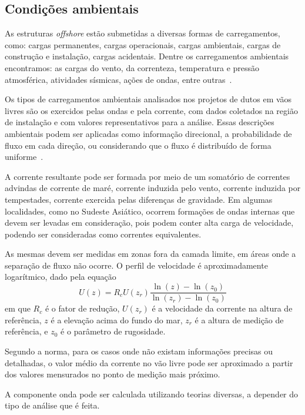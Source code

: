 \subsection{Condições ambientais}
\label{sec:condicoes-ambientais}

As estruturas \textit{offshore} estão submetidas a diversas formas de carregamentos, como: cargas permanentes, cargas operacionais, cargas ambientais, cargas de construção e instalação, cargas acidentais. Dentre os carregamentos ambientais encontramos: as cargas do vento, da correnteza, temperatura e pressão atmosférica, atividades sísmicas, ações de ondas, entre outras~\cite{Valenca2017}.

Os tipos de carregamentos ambientais analisados nos projetos de dutos em vãos livres são os exercidos pelas ondas e pela corrente, com dados coletados na região de instalação e com valores representativos para a análise. Essas descrições ambientais podem ser aplicadas como informação direcional, a probabilidade de fluxo em cada direção, ou considerando que o fluxo é distribuído de forma uniforme~\cite{DNV2017}.

A corrente resultante pode ser formada por meio de um somatório de correntes advindas de corrente de maré, corrente induzida pelo vento, corrente induzida por tempestades, corrente exercida pelas diferenças de gravidade. Em algumas localidades, como no Sudeste Asiático, ocorrem formações de ondas internas que devem ser levadas em consideração, pois podem conter alta carga de velocidade, podendo ser consideradas como correntes equivalentes.

As mesmas devem ser medidas em zonas fora da camada limite, em áreas onde a separação de fluxo não ocorre. 
O perfil de velocidade é aproximadamente logarítmico, dado pela equação
\begin{equation}
\label{eq:jdsn-eq1}
U(z) = R_c U(z_r) \frac{\ln{(z)}- \ln(z_0)}{\ln (z_r)- \ln (z_0)}
\end{equation}
em que $R_c$ é o fator de redução, $U(z_r)$ é a velocidade da corrente na altura de referência, $z$ é a elevação acima do fundo do mar, $z_r$ é a altura de medição de referência, e $z_0$ é o parâmetro de rugosidade.

Segundo a norma, para os casos onde não existam informações precisas ou detalhadas, o valor médio da corrente no vão livre pode ser aproximado a partir dos valores mensurados no ponto de medição mais próximo.

A componente onda pode ser calculada utilizando teorias diversas, a depender do tipo de análise que é feita.

